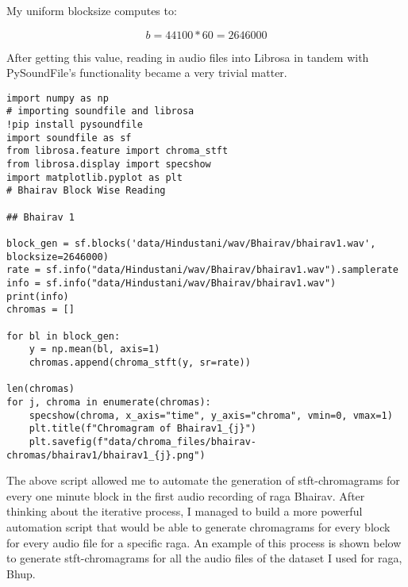 My uniform blocksize computes to:

$$ b = 44100 * 60 = 2646000 $$

After getting this value, reading in audio files into Librosa in tandem with PySoundFile's functionality became a very trivial matter.

\begin{lstlisting}
import numpy as np
# importing soundfile and librosa
!pip install pysoundfile
import soundfile as sf
from librosa.feature import chroma_stft
from librosa.display import specshow
import matplotlib.pyplot as plt
# Bhairav Block Wise Reading

## Bhairav 1

block_gen = sf.blocks('data/Hindustani/wav/Bhairav/bhairav1.wav', blocksize=2646000)
rate = sf.info("data/Hindustani/wav/Bhairav/bhairav1.wav").samplerate
info = sf.info("data/Hindustani/wav/Bhairav/bhairav1.wav")
print(info)
chromas = []

for bl in block_gen:
    y = np.mean(bl, axis=1)
    chromas.append(chroma_stft(y, sr=rate))

len(chromas)
for j, chroma in enumerate(chromas):
    specshow(chroma, x_axis="time", y_axis="chroma", vmin=0, vmax=1)
    plt.title(f"Chromagram of Bhairav1_{j}")
    plt.savefig(f"data/chroma_files/bhairav-chromas/bhairav1/bhairav1_{j}.png")
\end{lstlisting}

The above script allowed me to automate the generation of stft-chromagrams for every one minute block in the first audio recording of raga Bhairav. After thinking about the iterative process, I managed to build a more powerful automation script that would be able to generate chromagrams for every block for every audio file for a specific raga.  An example of this process is shown below to generate stft-chromagrams for all the audio files of the dataset I used for raga, Bhup.

